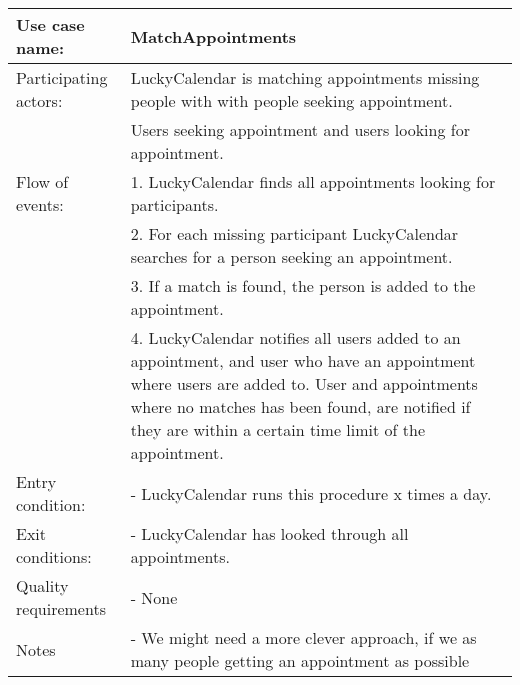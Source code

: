 {\tabulinesep=1.2mm
\begin{tabu}{ | p{3cm} | p{13cm} |}
    \hline
    Use case name: 			& 		MatchAppointments\\ \hline
    Participating actors:	& 		LuckyCalendar is matching appointments missing people with with people seeking appointment. \\
 							&		Users seeking appointment and users looking for appointment.\\ \hline
    Flow of events: 		& 		1. LuckyCalendar finds all appointments looking for participants. \\
							&		2. For each missing participant LuckyCalendar searches for a person seeking an appointment.\\
							&		3. If a match is found, the person is added to the appointment.\\
							&		4. LuckyCalendar notifies all users added to an appointment, and user who have an appointment where users are added to. User and appointments where no matches has been found, are notified if they are within a certain time limit of the appointment.\\\hline
    Entry condition: 		& 		- LuckyCalendar runs this procedure x times a day. \\ \hline
	Exit conditions: 		&		- LuckyCalendar has looked through all appointments.\\\hline
	Quality requirements	&	 	- None \\\hline
	Notes					&	 	- We might need a more clever approach, if we as many people getting an appointment as possible \\\hline
\end{tabu}
}